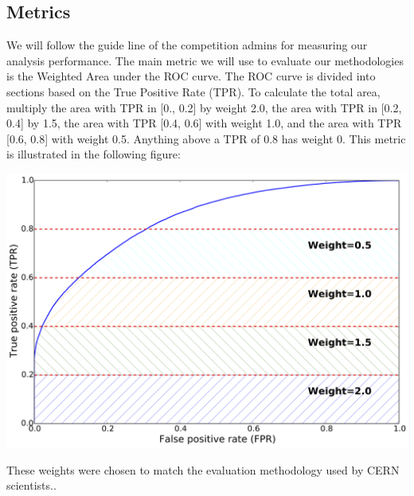 \documentclass{article} %
\begin{document}
\subsection*{Metrics}
We will follow the guide line of the competition admins for measuring our analysis performance. The main metric we will use to evaluate our methodologies is the Weighted Area under the ROC curve. The ROC curve is divided into sections based on the True Positive Rate (TPR). To calculate the total area, multiply the area with TPR in [0., 0.2] by weight 2.0, the area with TPR in [0.2, 0.4] by 1.5, the area with TPR [0.4, 0.6] with weight 1.0, and the area with TPR [0.6, 0.8] with weight 0.5. Anything above a TPR of 0.8 has weight 0. This metric is illustrated in the following figure:
\begin{center}
	\includegraphics[scale = .3]{roc_optimistic}
\end{center} 
These weights were chosen to match the evaluation methodology used by CERN scientists.\cite{kaggleComp}.

\printbibliography
\end{document}
